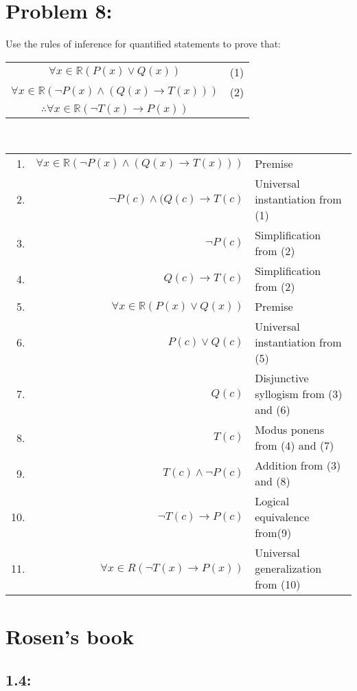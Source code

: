 \documentclass[12pt,en,a4paper]{report}
\begin{document}
	\section*{Problem 8:}
	Use the rules of inference for quantified statements to prove that:\\
	\begin{table}[h]
		\centering
		\begin{tabular}{c l}
			$\forall x \in \mathbb{R}(P(x) \vee Q(x))$ & (1)\\
			$\forall x \in \mathbb{R}(\neg P(x) \wedge (Q(x) \rightarrow T(x)))$ & (2)\\
			\hline
			$\therefore \forall x \in \mathbb{R}(\neg T(x) \rightarrow P(x))$ & {}\\
		\end{tabular}
	\end{table}\\
	\begin{tabular}{r r l}
		1. & $\forall x \in \mathbb{R}(\neg P(x) \wedge (Q(x) \rightarrow T(x)))$ & Premise\\
		2. & $\neg P(c) \wedge (Q(c) \rightarrow T(c)$ & Universal instantiation from (1)\\
		3. & $\neg P(c)$ & Simplification from (2)\\
		4. & $Q(c) \rightarrow T(c)$ & Simplification from (2)\\
		5. & $\forall x \in \mathbb{R} (P(x) \vee Q(x))$ & Premise\\
		6. & $P(c) \vee Q(c)$ & Universal instantiation from (5)\\
		7. & $Q(c)$ & Disjunctive syllogism from (3) and (6)\\
		8. & $T(c)$ & Modus ponens from (4) and (7)\\
		9. & $T(c) \wedge \neg P(c)$ & Addition from (3) and (8)\\
		10. & $\neg T(c) \rightarrow P(c)$ & Logical equivalence from(9)\\
		11. & $\forall x \in R (\neg T(x) \rightarrow P(x))$ & Universal generalization from (10)\\
	\end{tabular}
\newpage
{}
	\section*{Rosen's book}
	\subsection*{1.4:}
\end{document}
